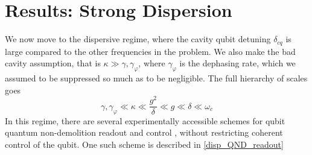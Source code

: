 \section{Results: Strong Dispersion}
We now move to the dispersive regime, where the cavity qubit detuning $\delta_{cq}$ is large compared to the other frequencies in the problem. 
We also make the bad cavity assumption, that is $\kappa \gg \gamma, \gamma_\varphi$, where $\gamma_\varphi$ is the dephasing rate, which we assumed to be suppressed so much as to be negligible.
The full hierarchy of scales goes
\begin{equation}
  \gamma, \gamma_\varphi \ll \kappa \ll \frac{g^2}{\delta} \ll g \ll \delta \ll \omega_c
\end{equation}
In this regime, there are several experimentally accessible schemes for qubit quantum non-demolition readout and control \cite{Blais2004a}, without restricting coherent control of the qubit.
One such scheme is described in \cref{disp_QND_readout} 

